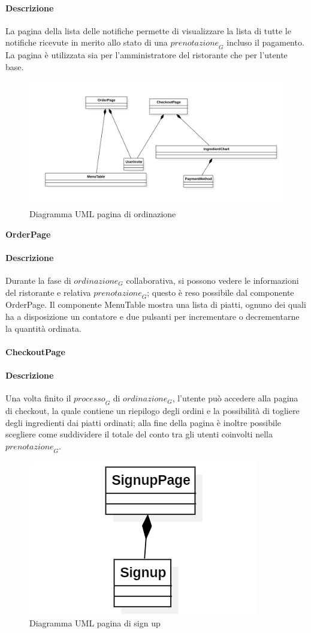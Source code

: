 \paragraph{Descrizione} La pagina della lista delle notifiche permette di visualizzare la lista di tutte le notifiche ricevute in merito allo stato di una $\textit{prenotazione}_G$ incluso il pagamento. La pagina è utilizzata sia per l'amministratore del ristorante che per l'utente base.

\begin{figure}[H]
    \centering
    \includegraphics[width=0.8\linewidth]{images/order_page_totale}
    \caption{Diagramma UML pagina di ordinazione}
    \label{fig:UML-login}
\end{figure}
\textbf{OrderPage}
\paragraph{Descrizione} Durante la fase di $\textit{ordinazione}_G$ collaborativa, si possono vedere le informazioni del ristorante e relativa $\textit{prenotazione}_G$; questo è reso possibile dal componente OrderPage. Il componente MenuTable mostra una lista di piatti, ognuno dei quali ha a disposizione un contatore e due pulsanti per incrementare o decrementarne la quantità ordinata.\\\\
\textbf{CheckoutPage}
\paragraph{Descrizione} Una volta finito il $\textit{processo}_G$ di $\textit{ordinazione}_G$, l'utente può accedere alla pagina di checkout, la quale contiene un riepilogo degli ordini e la possibilità di togliere degli ingredienti dai piatti ordinati; alla fine della pagina è inoltre possibile scegliere come suddividere il totale del conto tra gli utenti coinvolti nella $\textit{prenotazione}_G$.
\begin{figure}[H]
    \centering
    \includegraphics[width=0.45\linewidth]{images/signup.png}
    \caption{Diagramma UML pagina di sign up}
    \label{fig:UML-signup}
\end{figure}
